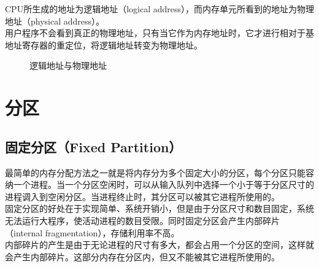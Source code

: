 CPU所生成的地址为逻辑地址（logical address），而内存单元所看到的地址为物理地址（physical address）。\\

用户程序不会看到真正的物理地址，只有当它作为内存地址时，它才进行相对于基地址寄存器的重定位，将逻辑地址转变为物理地址。

\begin{figure}[H]
    \centering
    \caption{逻辑地址与物理地址}
\end{figure}

\newpage

\section{分区}

\subsection{固定分区（Fixed Partition）}

最简单的内存分配方法之一就是将内存分为多个固定大小的分区，每个分区只能容纳一个进程。当一个分区空闲时，可以从输入队列中选择一个小于等于分区尺寸的进程调入到空闲分区。当进程终止时，其分区可以被其它进程所使用的。\\

固定分区的好处在于实现简单、系统开销小，但是由于分区尺寸和数目固定，系统无法运行大程序，使活动进程的数目受限。同时固定分区会产生内部碎片（internal fragmentation），存储利用率不高。\\

内部碎片的产生是由于无论进程的尺寸有多大，都会占用一个分区的空间，这样就会产生内部碎片。这部分内存在分区内，但又不能被其它进程所使用的。\\

